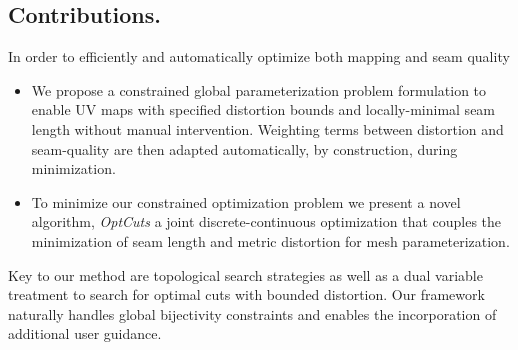 \subsection{Contributions.}

In order to efficiently and automatically optimize both mapping and seam quality 
\begin{itemize}
  \item We propose a constrained global parameterization problem formulation to enable UV maps with specified distortion bounds and locally-minimal seam length without manual intervention. Weighting terms between distortion and seam-quality are then adapted automatically, by construction, during minimization.
\item To minimize our constrained optimization problem we present a novel algorithm, \emph{OptCuts} a joint discrete-continuous optimization that couples the minimization of seam length and metric distortion for mesh parameterization. 
\end{itemize}

Key to our method are topological search strategies as well as a dual variable treatment to search for optimal cuts with bounded distortion. Our framework naturally handles global bijectivity constraints and enables the incorporation of additional user guidance.

